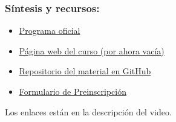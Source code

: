 \documentclass{beamer}
\begin{document}
\begin{frame}
\frametitle{Síntesis y recursos:}

\begin{itemize}
    \item \href{https://cgsanchez.net/MC2/pdfs/Programa_QM2_2021.pdf}{Programa oficial}
    \item \href{https://cgsanchez.net/QM2/}{Página web del curso (por ahora vacía)}
    \item \href{https://github.com/cgsanchez/MC2}{Repositorio del material en GitHub}
    \item \href{http://bit.ly/mc2fcen}{Formulario de Preinscripción}
\end{itemize}
\vspace{1cm}
\begin{center}
    Los enlaces están en la descripción del video.
\end{center}
\end{frame}
\end{document}
